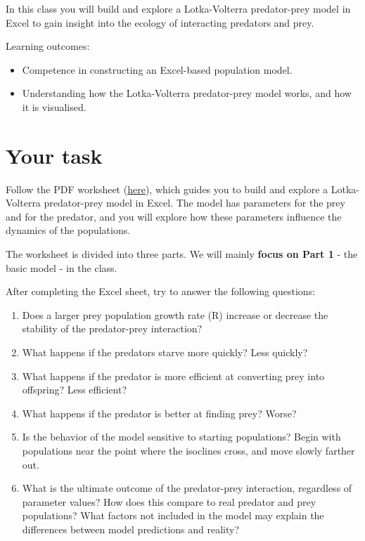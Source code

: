 \documentclass[
  a4paper]{book}
\providecommand{\tightlist}{%
  \setlength{\itemsep}{0pt}\setlength{\parskip}{0pt}}
\begin{document}
In this class you will build and explore a Lotka-Volterra predator-prey model in Excel to gain insight into the ecology of interacting predators and prey.

\begin{do-something}
Learning outcomes:

\begin{itemize}
\tightlist
\item
  Competence in constructing an Excel-based population model.
\item
  Understanding how the Lotka-Volterra predator-prey model works, and
  how it is visualised.
\end{itemize}
\end{do-something}

\hypertarget{your-task-13}{%
\section{Your task}\label{your-task-13}}

Follow the PDF worksheet (\href{https://www.dropbox.com/s/bhwoe161wp9p6hp/10.\%20Predator-prey\%20dynamics.pdf?dl=1}{here}), which guides you to build and explore a Lotka-Volterra predator-prey model in Excel. The model has parameters for the prey and for the predator, and you will explore how these parameters influence the dynamics of the populations.

The worksheet is divided into three parts. We will mainly \textbf{focus on Part 1} - the basic model - in the class.

After completing the Excel sheet, try to answer the following questions:

\begin{enumerate}
\def\labelenumi{\arabic{enumi}.}
\tightlist
\item
  Does a larger prey population growth rate (R) increase or decrease the stability of the predator-prey interaction?
\item
  What happens if the predators starve more quickly? Less quickly?
\item
  What happens if the predator is more efficient at converting prey into offspring? Less efficient?
\item
  What happens if the predator is better at finding prey? Worse?
\item
  Is the behavior of the model sensitive to starting populations? Begin with populations near the point where the isoclines cross, and move slowly farther out.
\item
  What is the ultimate outcome of the predator-prey interaction, regardless of parameter values? How does this compare to real predator and prey populations? What factors not included in the model may explain the differences between model predictions and reality?
\end{enumerate}
\end{document}
